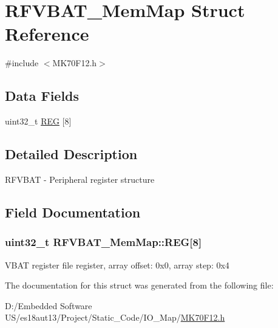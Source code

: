 \hypertarget{struct_r_f_v_b_a_t___mem_map}{}\section{R\+F\+V\+B\+A\+T\+\_\+\+Mem\+Map Struct Reference}
\label{struct_r_f_v_b_a_t___mem_map}


{\ttfamily \#include $<$M\+K70\+F12.\+h$>$}

\subsection*{Data Fields}
\begin{DoxyCompactItemize}
\item 
uint32\+\_\+t \hyperlink{struct_r_f_v_b_a_t___mem_map_a21ddc52aa162e182f22011520b5bf93b}{R\+E\+G} \mbox{[}8\mbox{]}
\end{DoxyCompactItemize}


\subsection{Detailed Description}
R\+F\+V\+B\+A\+T -\/ Peripheral register structure 

\subsection{Field Documentation}
\hypertarget{struct_r_f_v_b_a_t___mem_map_a21ddc52aa162e182f22011520b5bf93b}{}
\subsubsection[{R\+E\+G}]{\setlength{\rightskip}{0pt plus 5cm}uint32\+\_\+t R\+F\+V\+B\+A\+T\+\_\+\+Mem\+Map\+::\+R\+E\+G\mbox{[}8\mbox{]}}\label{struct_r_f_v_b_a_t___mem_map_a21ddc52aa162e182f22011520b5bf93b}
V\+B\+A\+T register file register, array offset\+: 0x0, array step\+: 0x4 

The documentation for this struct was generated from the following file\+:\begin{DoxyCompactItemize}
\item 
D\+:/\+Embedded Software U\+S/es18aut13/\+Project/\+Static\+\_\+\+Code/\+I\+O\+\_\+\+Map/\hyperlink{_m_k70_f12_8h}{M\+K70\+F12.\+h}\end{DoxyCompactItemize}
